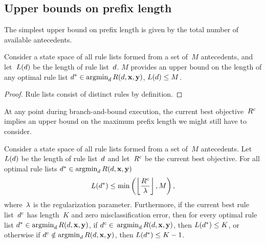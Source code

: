 \subsection{Upper bounds on prefix length}
\label{sec:ub-prefix-length}

The simplest upper bound on prefix length is given by the total
number of available antecedents.

\begin{proposition}
\label{prop:trivial-length}
Consider a state space of all rule lists formed from
a set of~$M$ antecedents,
and let~$L({d})$ be the length of rule list~${d}$.
%
$M$ provides an upper bound on the length of
any optimal rule list
${d^* \in \operatorname*{argmin}_{d} R({d}, \mathbf{x}, \mathbf{y})}$,
\ie ${L({d}) \le M}$.
\end{proposition}

\begin{proof}
Rule lists consist of distinct rules by definition.
\end{proof}

At any point during branch-and-bound execution, the current best objective~${R^c}$
implies an upper bound on the maximum prefix length we might still have to consider.

\begin{theorem}
\label{thm:ub-prefix-length}
Consider a state space of all rule lists formed from a set of~$M$ antecedents.
%
Let~$L({d})$ be the length of rule list~${d}$
and let~${R^c}$ be the current best objective.
%
For all optimal rule lists ${d^* \in \operatorname*{argmin}_{d} R({d}, \mathbf{x}, \mathbf{y})}$
\begin{align}
L(\OptimalRL) \le \min \left(\left\lfloor \frac{\CurrentObj}{\Reg} \right\rfloor, M \right),
\label{eq:max-length}
\end{align}
where~${\lambda}$ is the regularization parameter.
%
Furthermore, if the current best rule list~$d^c$
has length~$K$ and zero misclassification error,
then for every optimal rule list
${d^* \in \operatorname*{argmin}_{d} R({d}, \mathbf{x}, \mathbf{y})}$,
if ${d^c \in}$ ${\operatorname*{argmin}_d R({d}, \mathbf{x}, \mathbf{y})}$,
then ${L(d^*) \le K}$,
or otherwise if ${d^c \notin \operatorname*{argmin}_d R({d}, \mathbf{x}, \mathbf{y})}$,
then ${L(d^*) \le K - 1}$.
\end{theorem}

